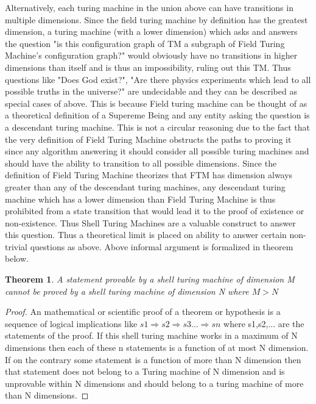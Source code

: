 \documentclass[11pt,onecolumn]{article}
\newtheorem{theorem}{Theorem}
\begin{document}
Alternatively, each turing machine in the union above can have transitions in multiple dimensions. Since  the field turing machine by definition has the greatest dimension, a turing machine (with a lower dimension) which asks and answers the question "is this configuration graph of TM a subgraph of Field Turing Machine's configuration graph?" would obviously have no transitions in higher dimensions than itself and is thus an impossibility, ruling out this TM.
Thus questions like "Does God exist?", "Are there physics experiments which lead to all possible truths in the universe?" are undecidable and they can be described as special cases of above. This is because Field  turing machine can be thought of as a theoretical definition of a Supereme Being and any entity asking the question is a descendant turing machine. This is not a circular reasoning due to the fact that the very definition of Field Turing Machine obstructs the paths to proving it since any algorithm answering it should consider all possible turing machines and should have the ability to transition to all possible dimensions. Since the definition of Field Turing Machine theorizes that FTM has dimension always greater than any of the descendant turing machines, any descendant turing machine which has a lower dimension than Field Turing Machine is thus prohibited from a state transition that would lead it to the proof of existence or non-existence. Thus Shell Turing Machines are a valuable construct to answer this question. Thus a theoretical limit is placed on ability to answer certain non-trivial questions as above. Above informal argument is formalized in theorem below.
\begin{theorem}
A statement provable by a shell turing machine of dimension M cannot be proved by a shell turing machine of dimension N where $M > N$
\end{theorem}
\begin{proof}
An mathematical or scientific proof of a theorem or hypothesis is a sequence of logical implications like $s1 \Rightarrow s2 \Rightarrow s3 ...\Rightarrow sn$ where s1,s2,... are the statements of the proof. If this shell turing machine works in a maximum of N dimensions then each of these n statements is a function of at most N dimension. If on the contrary some statement is a function of more than N dimension then that statement does not belong to a Turing machine of N dimension and is unprovable within N dimensions and should belong to a turing machine of more than N dimensions. 
\end{proof}
\end{document}
